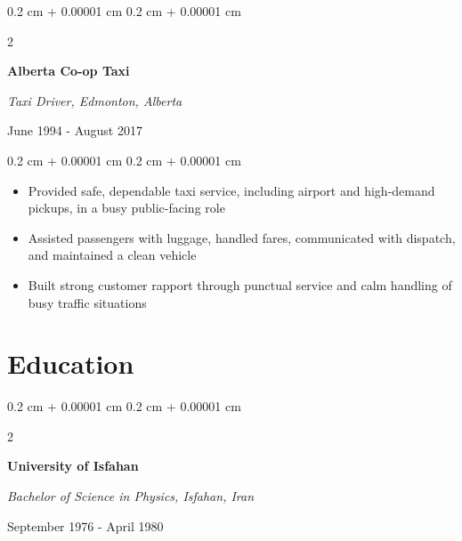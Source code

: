 \documentclass[10pt, letterpaper]{article}
\newenvironment{highlights}{
    \begin{itemize}[
        topsep=0.10 cm,
        parsep=0.10 cm,
        partopsep=0pt,
        itemsep=0pt,
        leftmargin=0.4 cm + 10pt
    ]
}{
    \end{itemize}
}
\newenvironment{onecolentry}{
    \begin{adjustwidth}{
        0.2 cm + 0.00001 cm
    }{
        0.2 cm + 0.00001 cm
    }
}{
    \end{adjustwidth}
}
\newenvironment{twocolentry}[2][]{
    \begin{adjustwidth}{
        0.2 cm + 0.00001 cm
    }{
        0.2 cm + 0.00001 cm
    }
    \def\secondColumn{#2}
    \setcolumnwidth{\fill, 4.5 cm}
    \begin{paracol}{2}
}{
    \switchcolumn \raggedleft \secondColumn
    \end{paracol}
    \end{adjustwidth}
}
\begin{document}
        \vspace{0.2 cm}

        \begin{twocolentry}{June 1994 - August 2017}
            \textbf{Alberta Co-op Taxi}

            \textit{Taxi Driver, Edmonton, Alberta}
        \end{twocolentry}

        \vspace{0.10 cm}
        \begin{onecolentry}
            \begin{highlights}
                \item Provided safe, dependable taxi service, including airport and high-demand pickups, in a busy public-facing role
                \item Assisted passengers with luggage, handled fares, communicated with dispatch, and maintained a clean vehicle
                \item Built strong customer rapport through punctual service and calm handling of busy traffic situations
            \end{highlights}
        \end{onecolentry}

    \section{Education}
        \begin{twocolentry}{September 1976 - April 1980}
            \textbf{University of Isfahan}

            \textit{Bachelor of Science in Physics, Isfahan, Iran}
        \end{twocolentry}
\end{document}
